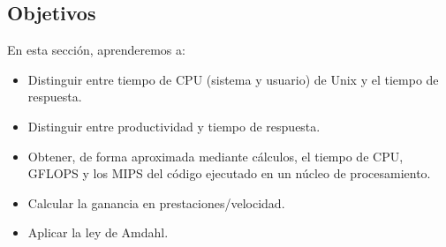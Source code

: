\subsection{Objetivos}
En esta sección, aprenderemos a:
\begin{itemize}
    \item Distinguir entre tiempo de CPU (sistema y usuario) de Unix y el tiempo de respuesta.
    \item Distinguir entre productividad y tiempo de respuesta.
    \item Obtener, de forma aproximada mediante cálculos, el tiempo de CPU, GFLOPS y los MIPS del código ejecutado en un núcleo de procesamiento.
    \item Calcular la ganancia en prestaciones/velocidad.
    \item Aplicar la ley de Amdahl.
\end{itemize}

